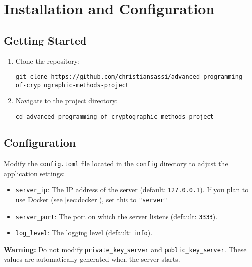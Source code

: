 \chapter{Installation and Configuration}
\label{cha:Installation}

\section{Getting Started}

\begin{enumerate}
    \item Clone the repository:

        \begin{lstlisting}
git clone https://github.com/christiansassi/advanced-programming-of-cryptographic-methods-project
        \end{lstlisting}

    \item Navigate to the project directory:
    
        \begin{lstlisting}
cd advanced-programming-of-cryptographic-methods-project
        \end{lstlisting}
\end{enumerate}

\section{Configuration}

Modify the \texttt{config.toml} file located in the \texttt{config} directory to adjust the application settings:

\begin{itemize}
    \item \texttt{server\_ip}: The IP address of the server (default: \texttt{127.0.0.1}). If you plan to use Docker (see \ref{sec:docker}), set this to \texttt{"server"}.
    \item \texttt{server\_port}: The port on which the server listens (default: \texttt{3333}).
    \item \texttt{log\_level}: The logging level (default: \texttt{info}).
\end{itemize}

\noindent
\begin{myWarning}
\textbf{Warning:} Do not modify \texttt{private\_key\_server} and \texttt{public\_key\_server}. These values are automatically generated when the server starts.
\end{myWarning}

